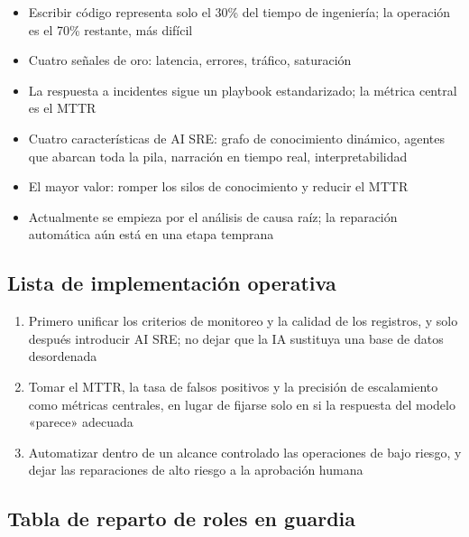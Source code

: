 \documentclass[a4paper]{article}
\begin{document}
\begin{itemize}
    \item Escribir código representa solo el 30\% del tiempo de ingeniería; la operación es el 70\% restante, más difícil
    \item Cuatro señales de oro: latencia, errores, tráfico, saturación
    \item La respuesta a incidentes sigue un playbook estandarizado; la métrica central es el MTTR
    \item Cuatro características de AI SRE: grafo de conocimiento dinámico, agentes que abarcan toda la pila, narración en tiempo real, interpretabilidad
    \item El mayor valor: romper los silos de conocimiento y reducir el MTTR
    \item Actualmente se empieza por el análisis de causa raíz; la reparación automática aún está en una etapa temprana
\end{itemize}

\subsection{Lista de implementación operativa}

\begin{enumerate}
    \item Primero unificar los criterios de monitoreo y la calidad de los registros, y solo después introducir AI SRE; no dejar que la IA sustituya una base de datos desordenada
    \item Tomar el MTTR, la tasa de falsos positivos y la precisión de escalamiento como métricas centrales, en lugar de fijarse solo en si la respuesta del modelo «parece» adecuada
    \item Automatizar dentro de un alcance controlado las operaciones de bajo riesgo, y dejar las reparaciones de alto riesgo a la aprobación humana
\end{enumerate}

\subsection{Tabla de reparto de roles en guardia}
\end{document}
